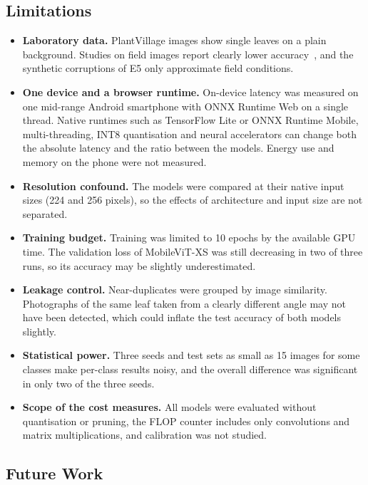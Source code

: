 \documentclass[conference]{IEEEtran}
\begin{document}
\subsection{Limitations}

\begin{itemize}
\item \textbf{Laboratory data.} PlantVillage images show single leaves on a plain background. Studies on field images report clearly lower accuracy~\cite{kumar2025mobilefriendly}, and the synthetic corruptions of E5 only approximate field conditions.
\item \textbf{One device and a browser runtime.} On-device latency was measured on one mid-range Android smartphone with ONNX Runtime Web on a single thread. Native runtimes such as TensorFlow Lite or ONNX Runtime Mobile, multi-threading, INT8 quantisation and neural accelerators can change both the absolute latency and the ratio between the models. Energy use and memory on the phone were not measured.
\item \textbf{Resolution confound.} The models were compared at their native input sizes (224 and 256 pixels), so the effects of architecture and input size are not separated.
\item \textbf{Training budget.} Training was limited to 10 epochs by the available GPU time. The validation loss of MobileViT-XS was still decreasing in two of three runs, so its accuracy may be slightly underestimated.
\item \textbf{Leakage control.} Near-duplicates were grouped by image similarity. Photographs of the same leaf taken from a clearly different angle may not have been detected, which could inflate the test accuracy of both models slightly.
\item \textbf{Statistical power.} Three seeds and test sets as small as 15 images for some classes make per-class results noisy, and the overall difference was significant in only two of the three seeds.
\item \textbf{Scope of the cost measures.} All models were evaluated without quantisation or pruning, the FLOP counter includes only convolutions and matrix multiplications, and calibration was not studied.
\end{itemize}

\subsection{Future Work}
\end{document}
